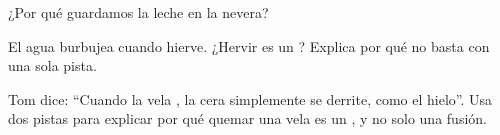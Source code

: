 \begin{exercise}[$\star$]\label{exo:g5:irreversible-changes:9}
¿Por qué guardamos la leche en la nevera?
\end{exercise}

\begin{exercise}[$\star\star$]\label{exo:g5:irreversible-changes:10}
El agua burbujea cuando hierve. ¿Hervir es un ? Explica
por qué no basta con una sola pista.
\end{exercise}

\begin{exercise}[$\star\star$]\label{exo:g5:irreversible-changes:11}
Tom dice: ``Cuando la vela , la cera simplemente se derrite, como
el hielo''. Usa dos pistas para explicar por qué quemar una vela es un
, y no solo una fusión.
\end{exercise}
